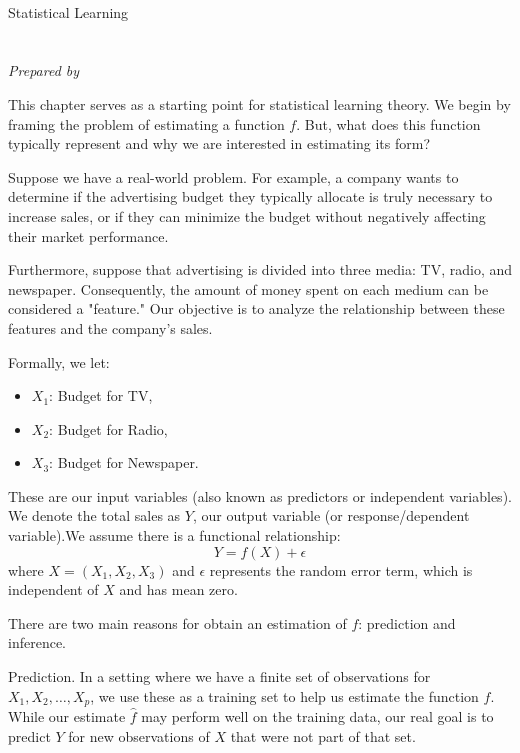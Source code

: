 \documentclass[12pt]{report}
\begin{document}
\begin{center}
    {\Large \textbf{\SolutionSeries}} \\[0.5em]
    {\large Statistical Learning} \\[0.5em]
    {\BookAuthors} \\ 
    {\BookEdition} \\[0.5em]
    \textit{Prepared by} \SolutionAuthor
\end{center}

\vspace{1em}

This chapter serves as a starting point for statistical learning theory. We begin by framing the problem of estimating a function $f$. But, what does this function typically represent and why we are interested in estimating its form?

Suppose we have a real-world problem. For example, a company wants to determine if the advertising budget they typically allocate is truly necessary to increase sales, or if they can minimize the budget without negatively affecting their market performance.  

Furthermore, suppose that advertising is divided into three media: TV, radio, and newspaper. Consequently, the amount of money spent on each medium can be considered a "feature." Our objective is to analyze the relationship between these features and the company's sales.

Formally, we let:
\begin{itemize}
\item $X_1$: Budget for TV,
\item $X_2$: Budget for Radio,
\item $X_3$: Budget for Newspaper.
\end{itemize}
These are our input variables (also known as predictors or independent variables). We denote the total sales as $Y$, our output variable (or response/dependent variable).We assume there is a functional relationship:
$$Y = f(X) + \epsilon$$
where $X = (X_1, X_2, X_3)$ and $\epsilon$ represents the random error term, which is independent of $X$ and has mean zero.

\bigskip

There are two main reasons for obtain an estimation of $f$: prediction and inference. 

{\color{codeblue}Prediction.} In a setting where we have a finite set of observations for $X_1, X_2, \dots, X_p$, we use these as a training set to help us estimate the function $f$. While our estimate $\hat{f}$ may perform well on the training data, our real goal is to predict $Y$ for new observations of $X$ that were not part of that set.
\end{document}
